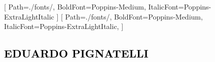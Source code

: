 \usepackage{etex}
\usepackage{enumitem}
\usepackage{CormorantGaramond}
\usepackage{import}

\usepackage{xltxtra,fontspec,xunicode}
[
    Path=./fonts/,
    BoldFont=Poppins-Medium,
    ItalicFont=Poppins-ExtraLightItalic
    ]
\setmonofont{Poppins-ExtraLight}[
    Path=./fonts/,
    BoldFont=Poppins-Medium,
    ItalicFont=Poppins-ExtraLightItalic,
    ]


\renewcommand{\emph}[1]{\textcolor{black}{\textbf{#1}}}
\usepackage[colorlinks=true, linkcolor=mblue, filecolor=magenta, urlcolor=mblue, pdfborderstyle={/S/U/W 1}]{hyperref}


\subsection*{\emph{\huge\MakeUppercase{Eduardo Pignatelli}}}








































